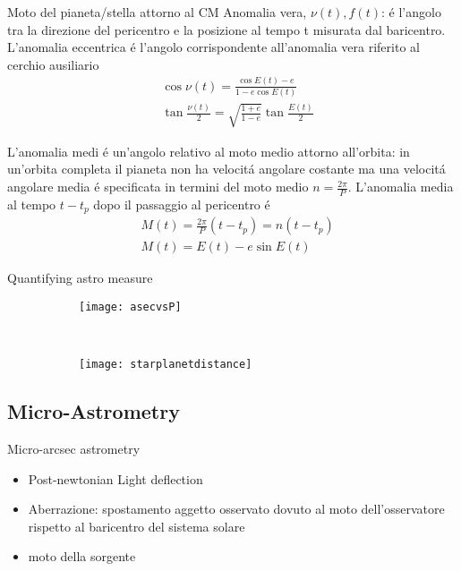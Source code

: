 \begin{wordonframe}{Moto del pianeta/stella attorno al CM}
Anomalia vera, $\nu(t), f(t)$: \'e l'angolo tra la direzione del pericentro e la posizione al tempo t misurata dal baricentro. L'anomalia eccentrica \'e l'angolo corrispondente all'anomalia vera riferito al cerchio ausiliario
\begin{align*}
&\cos{\nu(t)}=\frac{\cos{E(t)}-e}{1-e\cos{E(t)}}\\
&\tan{\frac{\nu(t)}{2}}=\sqrt{\frac{1+e}{1-e}}\tan{\frac{E(t)}{2}}
\end{align*}

L'anomalia medi \'e un'angolo relativo al moto medio attorno all'orbita: in un'orbita completa il pianeta non ha velocit\'a angolare costante ma una velocit\'a angolare media \'e specificata in termini del moto medio $n=\frac{2\pi}{P}$. L'anomalia media al tempo $t-t_p$ dopo il passaggio al pericentro \'e
\begin{align*}
&M(t)=\frac{2\pi}{P}(t-t_p)=n(t-t_p)\\
&M(t)=E(t)-e\sin{E(t)}
\end{align*}
\end{wordonframe}


\begin{frame}{Quantifying astro measure}
\begin{figure}[!ht] 
\begin{subfigure}[b]{0.47\textwidth}
\centering
\texttt{[image: asecvsP]}
\end{subfigure}
~
\begin{subfigure}[b]{0.47\textwidth}
\centering
\texttt{[image: starplanetdistance]}
\end{subfigure}
\end{figure}
\end{frame}

\subsection{Micro-Astrometry}

\begin{frame}{Micro-arcsec astrometry}
\begin{itemize}
\item Post-newtonian Light deflection
\item Aberrazione: spostamento aggetto osservato dovuto al moto dell'osservatore rispetto al baricentro del sistema solare
\item moto della sorgente
\end{itemize}
\end{frame}

